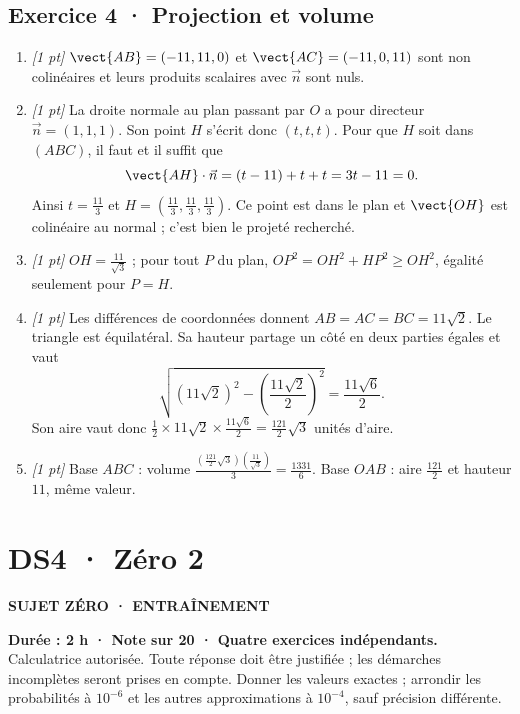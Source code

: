 \subsection*{Exercice 4 · Projection et volume}\begin{enumerate}

\item \textit{[1 pt]} $\vect{AB}=(-11,11,0)$ et $\vect{AC}=(-11,0,11)$ sont non colinéaires et leurs produits scalaires avec $\vec n$ sont nuls.

\item \textit{[1 pt]} La droite normale au plan passant par $O$ a pour directeur $\vec n=(1,1,1)$. Son point $H$ s'écrit donc $(t,t,t)$. Pour que $H$ soit dans $(ABC)$, il faut et il suffit que
\[\vect{AH}\cdot\vec n=(t-11)+t+t=3t-11=0.\]
Ainsi $t=\frac{11}{3}$ et $H=(\frac{11}{3},\frac{11}{3},\frac{11}{3})$. Ce point est dans le plan et $\vect{OH}$ est colinéaire au normal ; c'est bien le projeté recherché.

\item \textit{[1 pt]} $OH=\frac{11}{\sqrt{3}}$ ; pour tout $P$ du plan, $OP^2=OH^2+HP^2\ge OH^2$, égalité seulement pour $P=H$.

\item \textit{[1 pt]} Les différences de coordonnées donnent $AB=AC=BC=11\sqrt2$. Le triangle est équilatéral. Sa hauteur partage un côté en deux parties égales et vaut
\[\sqrt{(11\sqrt2)^2-(\frac{11\sqrt{2}}{2})^2}=\frac{11\sqrt6}{2}.\]
Son aire vaut donc $\frac12\times 11\sqrt2\times\frac{11\sqrt6}{2}=\frac{121}{2}\sqrt3$ unités d'aire.

\item \textit{[1 pt]} Base $ABC$ : volume $\frac{(\frac{121}{2}\sqrt3)(\frac{11}{\sqrt{3}})}{3}=\frac{1331}{6}$. Base $OAB$ : aire $\frac{121}{2}$ et hauteur $11$, même valeur.

\end{enumerate}

\fi

\clearpage{}\label{sujet:6-2}

\section*{DS4 · Zéro 2}

{\sffamily\bfseries\color{teal}SUJET ZÉRO · ENTRAÎNEMENT\par}

\textbf{Durée : 2 h · Note sur 20 · Quatre exercices indépendants.}\\Calculatrice autorisée. Toute réponse doit être justifiée ; les démarches incomplètes seront prises en compte. Donner les valeurs exactes ; arrondir les probabilités à $10^{-6}$ et les autres approximations à $10^{-4}$, sauf précision différente.

